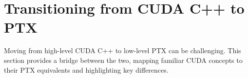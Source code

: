 \section{Transitioning from CUDA C++ to PTX}

Moving from high-level CUDA C++ to low-level PTX can be challenging. This section provides a bridge between the two, mapping familiar CUDA concepts to their PTX equivalents and highlighting key differences.

